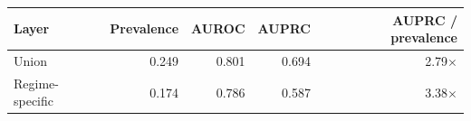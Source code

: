 \begin{tabular}{lrrrr}
\toprule
Layer & Prevalence & AUROC & AUPRC & AUPRC / prevalence \\
\midrule
Union & 0.249 & 0.801 & 0.694 & 2.79$\times$ \\
Regime-specific & 0.174 & 0.786 & 0.587 & 3.38$\times$ \\
\bottomrule
\end{tabular}
